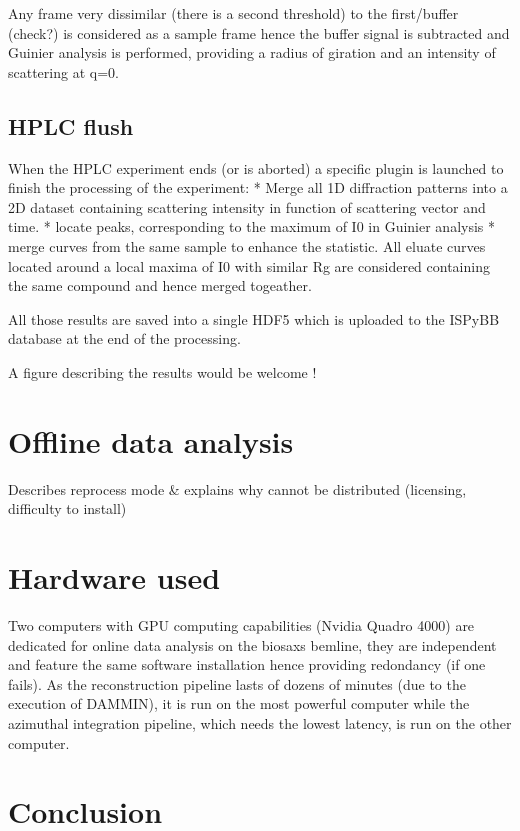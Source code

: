 \documentclass[preprint]{iucr}              %
\begin{document}
Any frame very dissimilar (there is a second threshold) to the first/buffer
(check?) is considered as a sample frame hence the buffer signal is subtracted
and Guinier analysis is performed, providing a radius of giration and an
intensity of scattering at q=0.
 
\subsection{HPLC flush}
When the HPLC experiment ends (or is aborted) a specific plugin is launched to
finish the processing of the experiment:
* Merge all 1D diffraction patterns into a 2D dataset containing scattering
intensity in function of scattering vector and time.
* locate peaks, corresponding to the maximum of I0 in Guinier analysis
* merge curves from the same sample to enhance the statistic. All eluate curves
located around a local maxima of I0 with similar Rg are considered
containing the same compound and hence merged togeather.

All those results are saved into a single HDF5 which is uploaded to the ISPyBB
database at the end of the processing.

A figure describing the results would be welcome ! 

\section{Offline data analysis}
Describes reprocess mode &
explains why cannot be distributed (licensing, difficulty to install)
 
\section{Hardware used}
Two computers with GPU computing capabilities (Nvidia Quadro 4000) are dedicated
for online data analysis on the biosaxs bemline, they are independent and
feature the same software installation hence providing redondancy (if one
fails).
As the  reconstruction pipeline lasts of dozens of minutes
(due to the execution of DAMMIN), it is run on the most powerful computer while 
the azimuthal integration pipeline, which needs the lowest latency, is run on
the other computer.



\section{Conclusion}
\end{document}
